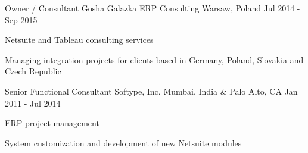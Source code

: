 
\begin{cventries}

	\cventry
		{Owner / Consultant}
		{Gosha Galazka ERP Consulting} %
		{Warsaw, Poland} %
		{Jul 2014 - Sep 2015} %
		{
			\begin{cvitems} %
				\item {Netsuite and Tableau consulting services}
				\item {Managing integration projects for clients based in Germany, Poland, Slovakia and Czech Republic}
			\end{cvitems}
		}


	\cventry
		{Senior Functional Consultant}
		{Softype, Inc.} %
		{Mumbai, India \& Palo Alto, CA} %
		{Jan 2011 - Jul 2014} %
		{
			\begin{cvitems} %
				\item {ERP project management}
				\item {System customization and development of new Netsuite modules}
			\end{cvitems}
		}

\end{cventries}
